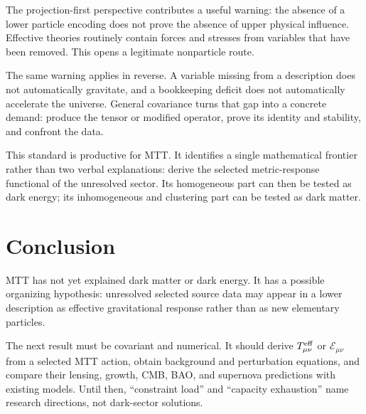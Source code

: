 \documentclass[11pt]{article}
\begin{document}
The projection-first perspective contributes a useful warning: the absence
of a lower particle encoding does not prove the absence of upper physical
influence. Effective theories routinely contain forces and stresses from
variables that have been removed. This opens a legitimate nonparticle route.

The same warning applies in reverse. A variable missing from a description
does not automatically gravitate, and a bookkeeping deficit does not
automatically accelerate the universe. General covariance turns that gap
into a concrete demand: produce the tensor or modified operator, prove its
identity and stability, and confront the data.

This standard is productive for MTT. It identifies a single mathematical
frontier rather than two verbal explanations: derive the selected
metric-response functional of the unresolved sector. Its homogeneous part
can then be tested as dark energy; its inhomogeneous and clustering part can
be tested as dark matter.

\section{Conclusion}

MTT has not yet explained dark matter or dark energy. It has a possible
organizing hypothesis: unresolved selected source data may appear in a
lower description as effective gravitational response rather than as new
elementary particles.

The next result must be covariant and numerical. It should derive
\(T^{\rm eff}_{\mu\nu}\) or \(\mathcal E_{\mu\nu}\) from a selected MTT
action, obtain background and perturbation equations, and compare their
lensing, growth, CMB, BAO, and supernova predictions with existing models.
Until then, ``constraint load'' and ``capacity exhaustion'' name research
directions, not dark-sector solutions.
\end{document}
